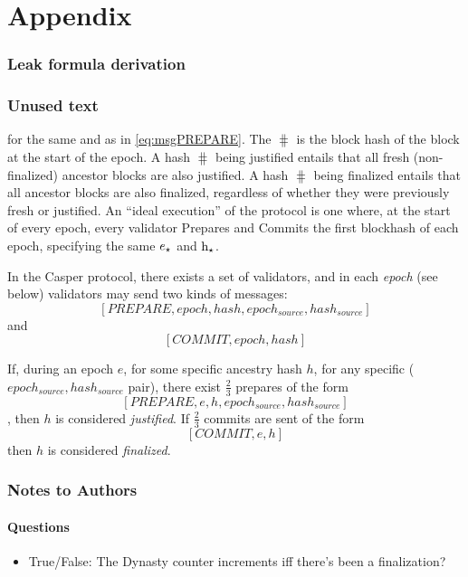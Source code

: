 \appendix
\clearpage
\part*{Appendix}

\section{Leak formula derivation}
\label{app:leak}

\section{Unused text}




for the same \epoch and \hash as in \eqref{eq:msgPREPARE}.  The $\hash$ is the block hash of the block at the start of the epoch.  A hash $\hash$ being justified entails that all fresh (non-finalized) ancestor blocks are also justified.  A hash $\hash$ being finalized entails that all ancestor blocks are also finalized, regardless of whether they were previously fresh or justified.  An ``ideal execution'' of the protocol is one where, at the start of every epoch, every validator Prepares and Commits the first blockhash of each epoch, specifying the same $e_{\star}$ and $\textnormal{h}_{\star}$.

In the Casper protocol, there exists a set of validators, and in each \textit{epoch} (see below) validators may send two kinds of messages: $$[PREPARE, epoch, hash, epoch_{source}, hash_{source}]$$ and $$[COMMIT, epoch, hash]$$


If, during an epoch $e$, for some specific ancestry hash $h$, for any specific ($epoch_{source}, hash_{source}$ pair), there exist $\frac{2}{3}$ prepares of the form $$[PREPARE, e, h, epoch_{source}, hash_{source}]$$, then $h$ is considered \textit{justified}. If $\frac{2}{3}$ commits are sent of the form $$[COMMIT, e, h]$$ then $h$ is considered \textit{finalized}.


\section{Notes to Authors}
\subsection{Questions}
\begin{itemize}
\item True/False: The Dynasty counter increments iff there's been a finalization?
\end{itemize}


